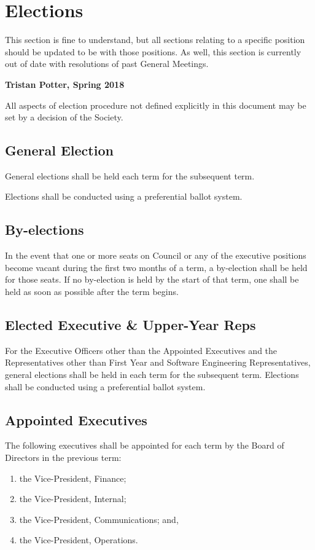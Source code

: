 \section{Elections}
\begin{annotation}
    This section is fine to understand, but all sections relating to a specific
    position should be updated to be with those positions. As well, this 
    section is currently out of date with resolutions of past General Meetings.
    
    \textbf{Tristan Potter, Spring 2018}
\end{annotation}

All aspects of election procedure not defined explicitly in this document may be
set by a decision of the Society.

\subsection{General Election}
General elections shall be held each term for the subsequent term.

Elections shall be conducted using a preferential ballot system.

\subsection{By-elections}
In the event that one or more seats on Council or any of the executive
positions become vacant during the first two months of a term, a by-election shall be held for those seats. If no by-election is held by the start of that
term, one shall be held as soon as possible after the term begins.

\subsection{Elected Executive \& Upper-Year Reps}
For the Executive Officers other than the Appointed Executives and the
Representatives other than First Year and Software Engineering Representatives,
general elections shall be held in each term for the subsequent term. Elections shall be conducted using a preferential ballot system.

\subsection{Appointed Executives}
The following executives shall be appointed for each term by the Board
of Directors in the previous term:
\begin{enumerate} 
    \item the Vice-President, Finance;
    \item the Vice-President, Internal;
    \item the Vice-President, Communications; and,
    \item the Vice-President, Operations.
\end{enumerate}

